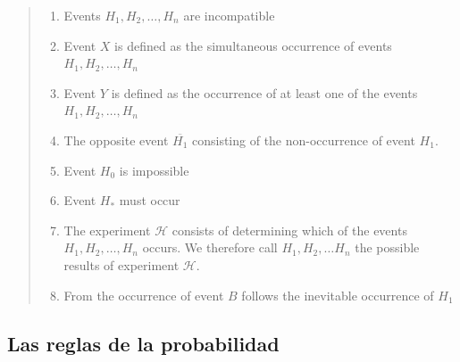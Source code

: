 \documentclass[a4paper,11pt]{book}
\theoremstyle{definition}
\begin{document}
\begin{quotation}
\begin{paracol}{2}
\begin{enumerate}
    \item Events $H_1, H_2, \dots, H_n$ are incompatible

    \item Event $X$ is defined as the simultaneous occurrence of events $H_1, H_2, \dots, H_n$

    \item Event $Y$ is defined as the occurrence of at least one of the events $H_1, H_2, \dots, H_n$

    \item The opposite event $\overline{H_1}$ consisting of the non-occurrence of event $H_1$.

    \item Event $H_0$ is impossible

    \item Event $H_{*}$ must occur

    \item The experiment $\mathcal{H}$ consists of determining which of the events $H_1, H_2, \dots, H_n $ occurs. We therefore call $H_1, H_2, \dots H_n$ the possible results of experiment $\mathcal{H}$.

    \item From the occurrence of event $B$ follows the inevitable occurrence of $H_1$
  \end{enumerate}

  \end{paracol}

\end{quotation}
%

\subsection{Las reglas de la probabilidad} \label{sec:reglas_de_la_probabilidad}
\end{document}
